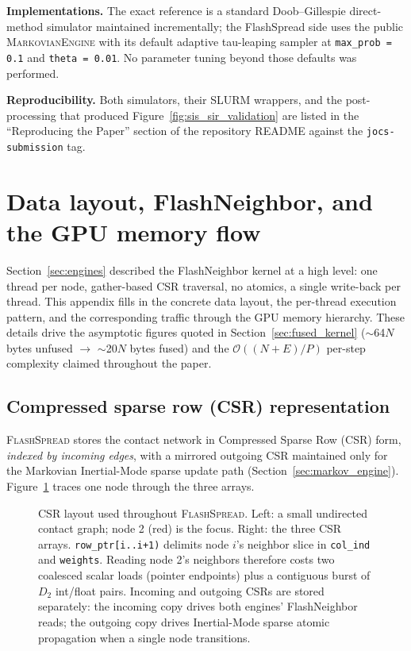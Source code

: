 \documentclass[a4paper,fleqn]{cas-sc}
\theoremstyle{definition}
\theoremstyle{remark}
\newcommand{\flashspread}{\textsc{FlashSpread}}
\newcommand{\bigO}{\mathcal{O}}
\begin{document}
\textbf{Implementations.} The exact reference is a standard Doob--Gillespie direct-method simulator maintained incrementally; the FlashSpread side uses the public \textsc{MarkovianEngine} with its default adaptive tau-leaping sampler at \texttt{max\_prob = 0.1} and \texttt{theta = 0.01}. No parameter tuning beyond those defaults was performed.

\textbf{Reproducibility.} Both simulators, their SLURM wrappers, and the post-processing that produced Figure~\ref{fig:sis_sir_validation} are listed in the ``Reproducing the Paper'' section of the repository README against the \texttt{jocs-submission} tag.

\section{Data layout, FlashNeighbor, and the GPU memory flow}
\label{app:data_flow}

Section~\ref{sec:engines} described the FlashNeighbor kernel at a high level: one thread per node, gather-based CSR traversal, no atomics, a single write-back per thread. This appendix fills in the concrete data layout, the per-thread execution pattern, and the corresponding traffic through the GPU memory hierarchy. These details drive the asymptotic figures quoted in Section~\ref{sec:fused_kernel} ($\sim$64$N$ bytes unfused $\to$ $\sim$20$N$ bytes fused) and the $\bigO((N{+}E)/P)$ per-step complexity claimed throughout the paper.

\subsection{Compressed sparse row (CSR) representation}
\label{app:csr}

\flashspread{} stores the contact network in Compressed Sparse Row (CSR) form, \emph{indexed by incoming edges}, with a mirrored outgoing CSR maintained only for the Markovian Inertial-Mode sparse update path (Section~\ref{sec:markov_engine}). Figure~\ref{fig:csr_layout} traces one node through the three arrays.

\begin{figure}[htbp]
\centering

\caption{CSR layout used throughout \flashspread{}. Left: a small undirected contact graph; node 2 (red) is the focus. Right: the three CSR arrays. \texttt{row\_ptr[i..i+1)} delimits node $i$'s neighbor slice in \texttt{col\_ind} and \texttt{weights}. Reading node 2's neighbors therefore costs two coalesced scalar loads (pointer endpoints) plus a contiguous burst of $D_2$ int/float pairs. Incoming and outgoing CSRs are stored separately: the incoming copy drives both engines' FlashNeighbor reads; the outgoing copy drives Inertial-Mode sparse atomic propagation when a single node transitions.}
\label{fig:csr_layout}
\end{figure}
\end{document}
